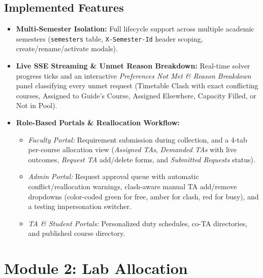 \documentclass[12pt,a4paper]{article}
\begin{document}
\subsection{Implemented Features}
\begin{itemize}[leftmargin=*]
    \item \textbf{Multi-Semester Isolation:} Full lifecycle support across multiple academic semesters (\texttt{semesters} table, \texttt{X-Semester-Id} header scoping, create/rename/activate modals).
    \item \textbf{Live SSE Streaming \& Unmet Reason Breakdown:} Real-time solver progress ticks and an interactive \textit{Preferences Not Met \& Reason Breakdown} panel classifying every unmet request (Timetable Clash with exact conflicting courses, Assigned to Guide's Course, Assigned Elsewhere, Capacity Filled, or Not in Pool).
    \item \textbf{Role-Based Portals \& Reallocation Workflow:}
    \begin{itemize}
        \item \textit{Faculty Portal:} Requirement submission during collection, and a 4-tab per-course allocation view (\textit{Assigned TAs}, \textit{Demanded TAs} with live outcomes, \textit{Request TA} add/delete forms, and \textit{Submitted Requests} status).
        \item \textit{Admin Portal:} Request approval queue with automatic conflict/reallocation warnings, clash-aware manual TA add/remove dropdowns (color-coded green for free, amber for clash, red for busy), and a testing impersonation switcher.
        \item \textit{TA \& Student Portals:} Personalized duty schedules, co-TA directories, and published course directory.
    \end{itemize}
\end{itemize}

\section{Module 2: Lab Allocation}
\end{document}
